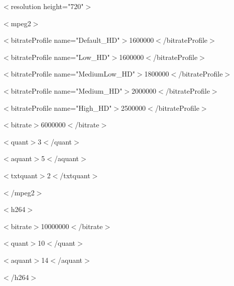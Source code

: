 \documentclass{article}
\begin{document}
$<$resolution height="720"$>$

$<$mpeg2$>$

$<$bitrateProfile name="Default\_HD"$>$1600000$<$/bitrateProfile$>$

$<$bitrateProfile name="Low\_HD"$>$1600000$<$/bitrateProfile$>$

$<$bitrateProfile name="MediumLow\_HD"$>$1800000$<$/bitrateProfile$>$

$<$bitrateProfile name="Medium\_HD"$>$2000000$<$/bitrateProfile$>$

$<$bitrateProfile name="High\_HD"$>$2500000$<$/bitrateProfile$>$

$<$bitrate$>$6000000$<$/bitrate$>$

$<$quant$>$3$<$/quant$>$

$<$aquant$>$5$<$/aquant$>$

$<$txtquant$>$2$<$/txtquant$>$

$<$/mpeg2$>$

$<$h264$>$

$<$bitrate$>$10000000$<$/bitrate$>$

$<$quant$>$10$<$/quant$>$

$<$aquant$>$14$<$/aquant$>$

$<$/h264$>$
\end{document}
